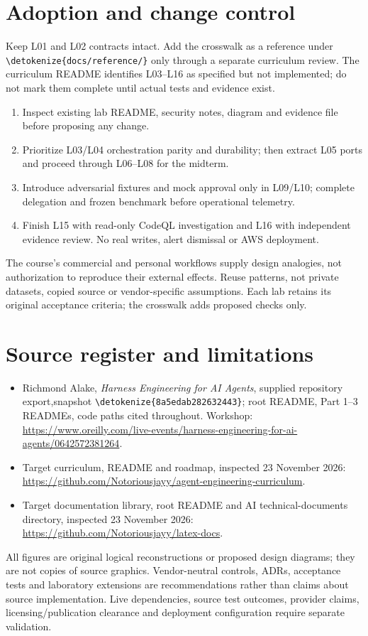 \documentclass[11pt,letterpaper]{article}
\newcommand{\src}[1]{\expandafter\nolinkurl\expandafter{\detokenize{#1}}}
\begin{document}
\section{Adoption and change control}
Keep L01 and L02 contracts intact. Add the crosswalk as a reference under \src{docs/reference/} only through a separate curriculum review. The curriculum README identifies L03--L16 as specified but not implemented; do not mark them complete until actual tests and evidence exist.
\begin{enumerate}
\item Inspect existing lab README, security notes, diagram and evidence file before proposing any change.
\item Prioritize L03/L04 orchestration parity and durability; then extract L05 ports and proceed through L06--L08 for the midterm.
\item Introduce adversarial fixtures and mock approval only in L09/L10; complete delegation and frozen benchmark before operational telemetry.
\item Finish L15 with read-only CodeQL investigation and L16 with independent evidence review. No real writes, alert dismissal or AWS deployment.
\end{enumerate}
The course's commercial and personal workflows supply design analogies, not authorization to reproduce their external effects. Reuse patterns, not private datasets, copied source or vendor-specific assumptions. Each lab retains its original acceptance criteria; the crosswalk adds proposed checks only.

\section{Source register and limitations}
\begin{itemize}
\item Richmond Alake, \textit{Harness Engineering for AI Agents}, supplied repository export,\newline snapshot \src{8a5edab282632443}; root README, Part 1--3 READMEs, code paths cited throughout. Workshop: \url{https://www.oreilly.com/live-events/harness-engineering-for-ai-agents/0642572381264}.
\item Target curriculum, README and roadmap, inspected 23 November 2026: \url{https://github.com/Notoriousjayy/agent-engineering-curriculum}.
\item Target documentation library, root README and AI technical-documents directory, inspected 23 November 2026: \url{https://github.com/Notoriousjayy/latex-docs}.
\end{itemize}
All figures are original logical reconstructions or proposed design diagrams; they are not copies of source graphics. Vendor-neutral controls, ADRs, acceptance tests and laboratory extensions are recommendations rather than claims about source implementation. Live dependencies, source test outcomes, provider claims, licensing/publication clearance and deployment configuration require separate validation.
\end{document}
